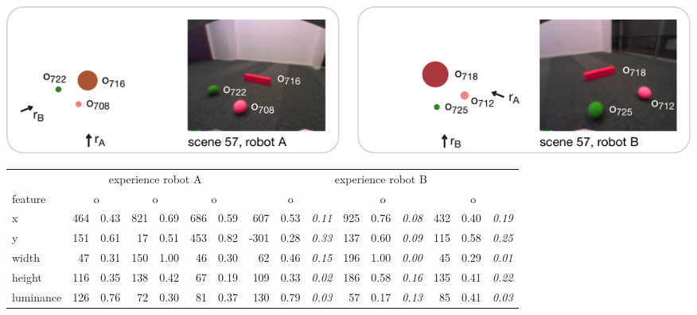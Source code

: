\parbox{\textwidth}{\fontsize{2.25mm}{2.5mm}\sffamily 
  \includegraphics[width=1\textwidth]{figures/vision-system-example-scene}
  \vspace{1mm}
  
  \renewcommand{\arraystretch}{1.5}
  \newcommand{\sub}[1]{\raisebox{-2pt}{\tiny#1}}
  \addtolength{\tabcolsep}{-2.4pt}
  \hskip0.5mm\begin{tabular*}{\textwidth}{@{}p{17.5mm}|rl|rl|rl||rll|rll|rll@{}}
    & \multicolumn{6}{c||}{experience robot A} & \multicolumn{9}{c}{experience robot B} \\
    feature & 
    \multicolumn{2}{c}{o\sub{708}} & 
    \multicolumn{2}{c}{o\sub{716}} &
    \multicolumn{2}{c||}{o\sub{722}} & 
    \multicolumn{3}{c}{o\sub{712}} & 
    \multicolumn{3}{c}{o\sub{718}} & 
    \multicolumn{3}{c}{o\sub{725}} \\
    \hline
    x & 464 & 0.43 & 821 & 0.69 & 686 & 0.59
    & 607 & 0.53 & \itshape\textcolor{dark}{0.11}
    & 925 & 0.76 & \itshape\textcolor{dark}{0.08}
    & 432 & 0.40 & \itshape\textcolor{dark}{0.19} \\
    y & 151 & 0.61 & 17 & 0.51 & 453 & 0.82
    & -301 & 0.28 & \itshape\textcolor{dark}{0.33}
    & 137 & 0.60 & \itshape\textcolor{dark}{0.09}
    & 115 & 0.58 & \itshape\textcolor{dark}{0.25} \\
    width & 47 & 0.31 & 150 & 1.00 & 46 & 0.30
    & 62 & 0.46 & \itshape\textcolor{dark}{0.15}
    & 196 & 1.00 & \itshape\textcolor{dark}{0.00}
    & 45 & 0.29 & \itshape\textcolor{dark}{0.01} \\
    height & 116 & 0.35 & 138 & 0.42 & 67 & 0.19
    & 109 & 0.33 & \itshape\textcolor{dark}{0.02}
    & 186 & 0.58 & \itshape\textcolor{dark}{0.16}
    & 135 & 0.41 & \itshape\textcolor{dark}{0.22} \\
    luminance & 126 & 0.76 & 72 & 0.30 & 81 & 0.37
    & 130 & 0.79 & \itshape\textcolor{dark}{0.03}
    & 57 & 0.17 & \itshape\textcolor{dark}{0.13}
    & 85 & 0.41 & \itshape\textcolor{dark}{0.03} \\

\end{tabular*}}
